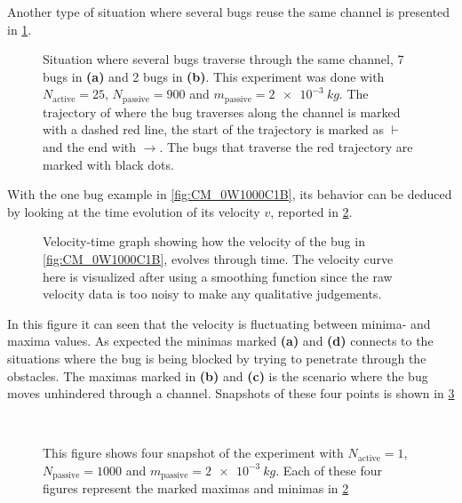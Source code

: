 Another type of situation where several bugs reuse the same 
channel is presented in \cref{fig:CM_0W900C25B}.

\begin{figure}[htpb!]
\centering
{}\quad
{}
\caption{Situation where several bugs traverse through the same channel, 
7 bugs in \textbf{(a)} and 2 bugs in \textbf{(b)}.
This experiment was done with $N_{\text{active}}=25$, $N_{\text{passive}}=900$ and 
$m_{\text{passive}}=\SI{2e-3}{kg}$. The trajectory of where the bug traverses along the 
channel is marked with a dashed red line, the start of the trajectory is marked as $\vdash$ and the 
end with $\rightarrow$. The bugs that traverse the red trajectory are marked with black dots.} 
\label{fig:CM_0W900C25B}
\end{figure}


With the one bug example in \cref{fig:CM_0W1000C1B}, its behavior can be deduced by looking at the time 
evolution of its velocity $v$, reported in \cref{fig:CM_0W1000C1B_vt}.

\begin{figure}[htbp!]
\centering
{}
\caption{Velocity-time graph showing how the velocity of the bug in \cref{fig:CM_0W1000C1B}, evolves through time. 
 The velocity curve here is visualized after using a smoothing function since the raw velocity 
 data is too noisy to make any qualitative judgements.} 
\label{fig:CM_0W1000C1B_vt}
\end{figure}

In this figure it can seen that the velocity is fluctuating between minima- and maxima values. 
As expected the minimas marked  \textbf{(a)} and \textbf{(d)} connects to the situations 
where the bug is being blocked by trying to penetrate through the obstacles. The maximas marked in 
\textbf{(b)} and \textbf{(c)} is the scenario where the bug moves unhindered through a channel. 
Snapshots of these four points is shown in \cref{fig:0W1000C1B_vt_refer}

\begin{figure}[htbp!]
\centering
{}\quad
{}\\
\quad
{}
\caption{This figure shows four snapshot of the experiment with
$N_{\text{active}}=1$, $N_{\text{passive}}=1000$ and 
$m_{\text{passive}}=\SI{2e-3}{kg}$. Each of these four figures represent the marked 
maximas and minimas in \cref{fig:CM_0W1000C1B_vt}} 
\label{fig:0W1000C1B_vt_refer}
\end{figure}

